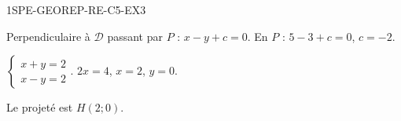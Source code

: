
\begin{corrige}{1SPE-GEOREP-RE-C5-EX3}

Perpendiculaire à $\mathcal{D}$ passant par $P$ : $x - y + c = 0$. En $P$ : $5 - 3 + c = 0$, $c = -2$.

$\begin{cases} x + y = 2 \\ x - y = 2 \end{cases}$. $2x = 4$, $x = 2$, $y = 0$.

Le projeté est $H(2 ; 0)$.

\end{corrige}
